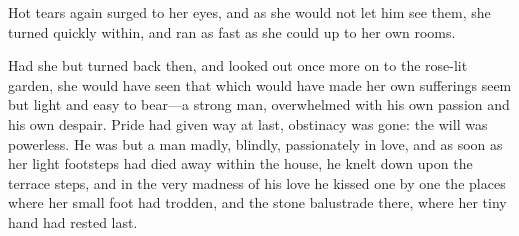 Hot tears again surged to her eyes, and as she would not let him see them, she turned quickly within, and ran as fast as she could up to her own rooms.

Had she but turned back then, and looked out once more on to the rose-lit garden, she would have seen that which would have made her own sufferings seem but light and easy to bear\allowbreak---\allowbreak a strong man, overwhelmed with his own passion and his own despair. Pride had given way at last, obstinacy was gone: the will was powerless. He was but a man madly, blindly, passionately in love, and as soon as her light footsteps had died away within the house, he knelt down upon the terrace steps, and in the very madness of his love he kissed one by one the places where her small foot had trodden, and the stone balustrade there, where her tiny hand had rested last.